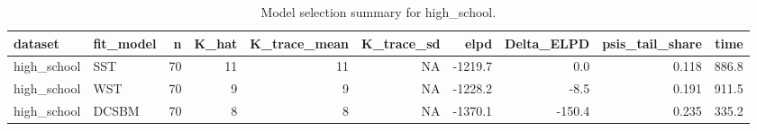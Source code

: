 \begin{table}

\caption{\label{tab:tab:model_selection_high_school}Model selection summary for high_school.}
\centering
\begin{tabular}[t]{llrrrrrrrr}
\toprule
dataset & fit\_model & n & K\_hat & K\_trace\_mean & K\_trace\_sd & elpd & Delta\_ELPD & psis\_tail\_share & time\\
\midrule
high\_school & SST & 70 & 11 & 11 & NA & -1219.7 & 0.0 & 0.118 & 886.8\\
high\_school & WST & 70 & 9 & 9 & NA & -1228.2 & -8.5 & 0.191 & 911.5\\
high\_school & DCSBM & 70 & 8 & 8 & NA & -1370.1 & -150.4 & 0.235 & 335.2\\
\bottomrule
\end{tabular}
\end{table}
